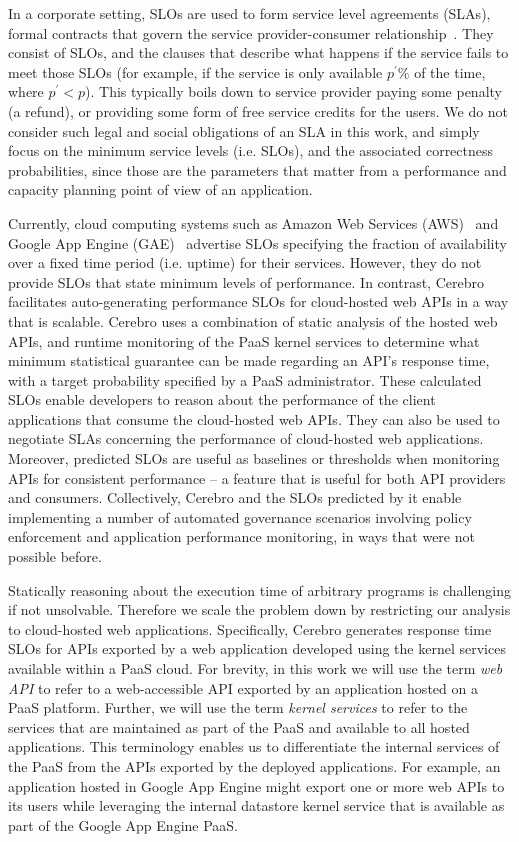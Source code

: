 In a corporate setting, SLOs are used to form service level agreements (SLAs), 
formal contracts that govern the service provider-consumer relationship~\cite{Keller:2003:WFS:635430.635442}.
They consist of SLOs, and the clauses that describe what happens if the
service fails to meet those SLOs (for example, if the
service is only available $p^\prime\%$ of the time, where $p^\prime < p$). This
typically boils down to service provider paying some penalty (a refund), or 
providing some form of free service credits for the users. We do not consider such
legal and social obligations of an SLA in this work, and simply focus on the
minimum service levels (i.e. SLOs), and the associated correctness probabilities, since those
are the parameters that matter from a performance and capacity planning point of view
of an application. 

Currently, cloud computing systems such as Amazon Web Services
(AWS)~\cite{amazon-aws-web} and
Google App Engine (GAE)~\cite{gae} advertise SLOs specifying the fraction of
availability over a fixed time period (i.e. uptime) for their services.
However, they do not provide SLOs
that state minimum levels of performance.
In contrast, Cerebro facilitates auto-generating performance SLOs for cloud-hosted
web APIs in a way that is scalable.
Cerebro uses a combination of static analysis of the hosted web APIs, 
and runtime monitoring of the PaaS kernel services
to determine what minimum statistical guarantee can be made regarding an
API's response time,
with a target probability specified by a PaaS administrator. These calculated
SLOs enable developers to
reason about the performance of the client applications that consume the cloud-hosted
web APIs. They can also be used to negotiate SLAs concerning the performance of
cloud-hosted web applications.
Moreover, predicted SLOs are useful as baselines or thresholds when monitoring APIs 
for consistent performance -- a feature that is useful for both API providers
and consumers. Collectively, Cerebro and the SLOs predicted by it 
enable implementing a number of automated governance scenarios involving
policy enforcement and application performance monitoring, in ways that
were not possible before.

Statically reasoning about the execution time of arbitrary programs is challenging
if not unsolvable. Therefore we scale the problem down by restricting our analysis
to cloud-hosted web applications. Specifically, 
Cerebro generates response time SLOs for APIs exported by a web
application
developed using the kernel services available within a PaaS cloud. For brevity, in this work
we will use the
term \textit{web API} to refer to a web-accessible API exported by an
application hosted on a PaaS platform. Further, 
we will use the term \textit{kernel services} to refer to the services that are 
maintained as part of the PaaS and
available to all hosted applications. This terminology enables us to
differentiate the internal services of the PaaS from the 
APIs exported by the deployed applications.   
For example, an application hosted in Google App Engine might export one or
more web APIs to its users while leveraging the internal 
datastore kernel service that is available as part of the Google App Engine PaaS.

